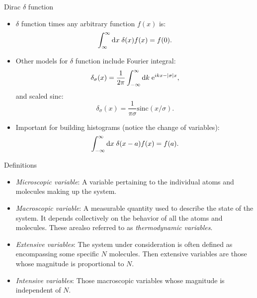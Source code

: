 \documentclass[10pt]{beamer}
\begin{document}
\begin{frame}{Dirac $\delta$ function}
\begin{itemize}
\setlength\itemsep{1em}
  \item $\delta$ function times any arbitrary function $f(x)$ is:
  \begin{equation}
    \int_\infty^\infty \mathrm{d} x\; \delta(x)f(x) = f(0).
  \end{equation}

  \item Other models for $\delta$ function include Fourier integral:
  \begin{equation}
    \delta_\sigma(x) = \frac{1}{2\pi} \int_{-\infty}^\infty \mathrm{d} k\; \mathrm{e}^{ikx-|\sigma|x},
  \end{equation}
  and scaled sinc:
  \begin{equation}
    \delta_\sigma(x) = \frac{1}{\pi\sigma}\mathrm{sinc}(x/\sigma).
  \end{equation}

  \item Important for building histograms (notice the change of variables):
  \begin{equation}
    \int_{-\infty}^\infty \mathrm{d} x\; \delta(x-a)f(x) = f(a).
  \end{equation}
\end{itemize}
\end{frame}

\begin{frame}{Definitions}
\begin{itemize}
\setlength\itemsep{1em}
  \item \textit{Microscopic variable}: A variable pertaining to the individual atoms and molecules making up the system.

  \item \textit{Macroscopic variable}: A measurable quantity used to describe the state of the system. It depends collectively on the behavior of all the atoms and molecules. These arealso referred to as \textit{thermodynamic variables}.

  \item \textit{Extensive variables}: The system under consideration is often defined as encompassing some specific $N$ molecules. Then extensive variables are those whose magnitude is proportional to $N$.

  \item \textit{Intensive variables}: Those macroscopic variables whose magnitude is independent of $N$.
\end{itemize}
\end{frame}
\end{document}
